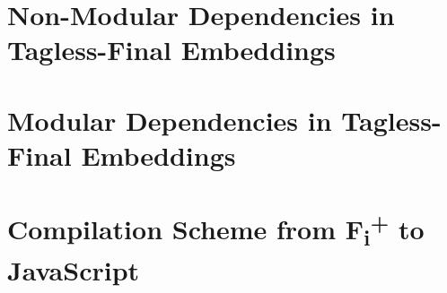 \chapter{Non-Modular Dependencies in Tagless-Final Embeddings} \label{sec:tagless}


\chapter{Modular Dependencies in Tagless-Final Embeddings} \label{sec:fancier}


\chapter{Compilation Scheme from F\textsubscript{i}\!\textsuperscript{+} to JavaScript} \label{sec:fiplus-js}

